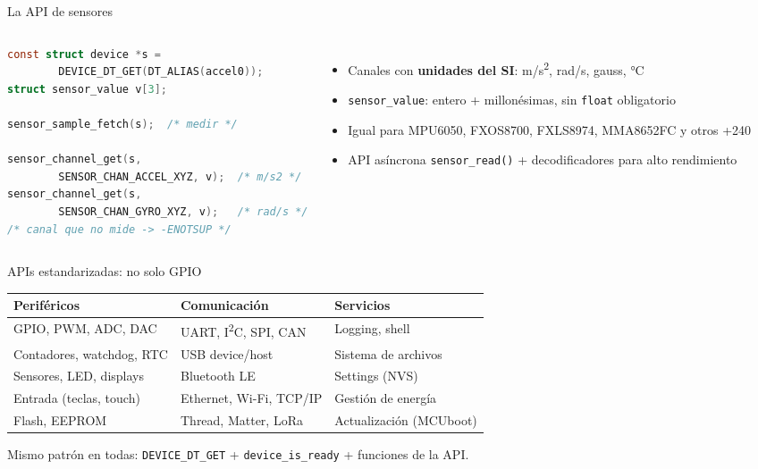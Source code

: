 \documentclass[aspectratio=169]{beamer}
\begin{document}
\begin{frame}[fragile]{La API de sensores}
\begin{columns}[T]
\begin{lstlisting}[language=C]
const struct device *s =
        DEVICE_DT_GET(DT_ALIAS(accel0));
struct sensor_value v[3];

sensor_sample_fetch(s);  /* medir */

sensor_channel_get(s,
        SENSOR_CHAN_ACCEL_XYZ, v);  /* m/s2 */
sensor_channel_get(s,
        SENSOR_CHAN_GYRO_XYZ, v);   /* rad/s */
/* canal que no mide -> -ENOTSUP */
\end{lstlisting}
\begin{itemize}
    \item Canales con \textbf{unidades del SI}: m/s\textsuperscript{2}, rad/s, gauss, °C
    \item \texttt{sensor\_value}: entero + millonésimas, sin \texttt{float} obligatorio
    \item Igual para MPU6050, FXOS8700, FXLS8974, MMA8652FC y otros +240
    \item API asíncrona \texttt{sensor\_read()} + decodificadores para alto rendimiento
\end{itemize}
\end{columns}
\end{frame}

\begin{frame}{APIs estandarizadas: no solo GPIO}
\centering
\small
\begin{tabular}{lll}
\toprule
\textbf{Periféricos} & \textbf{Comunicación} & \textbf{Servicios} \\
\midrule
GPIO, PWM, ADC, DAC & UART, I\textsuperscript{2}C, SPI, CAN & Logging, shell \\
Contadores, watchdog, RTC & USB device/host & Sistema de archivos \\
Sensores, LED, displays & Bluetooth LE & Settings (NVS) \\
Entrada (teclas, touch) & Ethernet, Wi-Fi, TCP/IP & Gestión de energía \\
Flash, EEPROM & Thread, Matter, LoRa & Actualización (MCUboot) \\
\bottomrule
\end{tabular}

\vspace{0.8em}
Mismo patrón en todas: \texttt{DEVICE\_DT\_GET} + \texttt{device\_is\_ready} + funciones de la API.
\end{frame}
\end{document}
